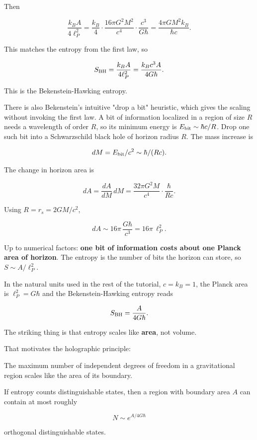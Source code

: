 \documentclass[11pt,a4paper]{article}
\newenvironment{qiqtquote}{\begin{mdframed}[style=quotestyle]}{\end{mdframed}}
\begin{document}
Then

\[
\frac{k_B A}{4 \ell_P^2}
= \frac{k_B}{4} \cdot \frac{16\pi G^2 M^2}{c^4} \cdot \frac{c^3}{G\hbar}
= \frac{4\pi G M^2 k_B}{\hbar c}.
\]

This matches the entropy from the first law, so

\[
S_{\rm BH} = \frac{k_B A}{4 \ell_P^2} = \frac{k_B c^3 A}{4 G \hbar}.
\]

This is the Bekenstein-Hawking entropy.

There is also Bekenstein's intuitive "drop a bit" heuristic, which gives the scaling without invoking the first law. A bit of information localized in a region of size $R$ needs a wavelength of order $R$, so its minimum energy is $E_{\rm bit} \sim \hbar c / R$. Drop one such bit into a Schwarzschild black hole of horizon radius $R$. The mass increase is

\[
dM = E_{\rm bit} / c^2 \sim \hbar / (R c).
\]

The change in horizon area is

\[
dA = \frac{dA}{dM} \, dM = \frac{32\pi G^2 M}{c^4} \cdot \frac{\hbar}{R c}.
\]

Using $R = r_s = 2GM/c^2$,

\[
dA \sim 16\pi \, \frac{G\hbar}{c^3} = 16\pi \, \ell_P^2.
\]

Up to numerical factors: \textbf{one bit of information costs about one Planck area of horizon}. The entropy is the number of bits the horizon can store, so $S \sim A/\ell_P^2$.

In the natural units used in the rest of the tutorial, $c = k_B = 1$, the Planck area is $\ell_P^2 = G\hbar$ and the Bekenstein-Hawking entropy reads

\[
S_{\rm BH} = \frac{A}{4G\hbar}.
\]

The striking thing is that entropy scales like \textbf{area}, not volume.

That motivates the holographic principle:

\begin{qiqtquote}
The maximum number of independent degrees of freedom in a gravitational region scales like the area of its boundary.
\end{qiqtquote}

If entropy counts distinguishable states, then a region with boundary area $A$ can contain at most roughly

\[
N \sim e^{A/4G\hbar}
\]

orthogonal distinguishable states.
\end{document}
